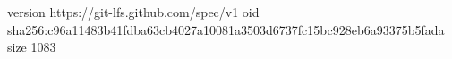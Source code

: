 version https://git-lfs.github.com/spec/v1
oid sha256:c96a11483b41fdba63cb4027a10081a3503d6737fc15bc928eb6a93375b5fada
size 1083
